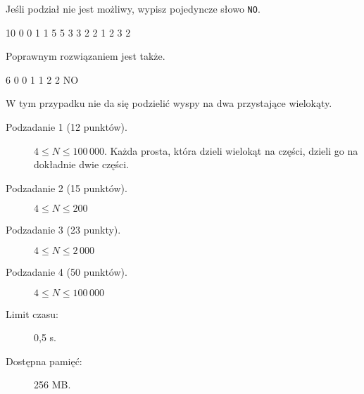 \documentclass{boi2014-pl}
\newcommand{\constant}[1]{{\tt #1}}
\begin{document}
        Jeśli podział nie jest możliwy, wypisz pojedyncze słowo \constant{NO}.

    \clearpage

    \Examples
	\example
	{
		10  0  0  1  1  5  5  3  3  2  2
	}
	{
		1 2 3 2
	}
	{
        Poprawnym rozwiązaniem jest także.
	
        \begin{center}
        \end{center}
        }

	\example
	{
		6  0  0  1  1  2  2
	}
	{
		NO
	}
        {
        W tym przypadku nie da się podzielić wyspy na dwa przystające wielokąty.
        \begin{center}
        \end{center}
        }

    \Scoring

    \begin{description}
        \item[Podzadanie 1 (12 punktów).] $4 \le N \le 100\,000$.
        Każda prosta, która dzieli wielokąt na części, dzieli go na dokładnie dwie części.
        \item[Podzadanie 2 (15 punktów).] $4 \le N \le 200$
        \item[Podzadanie 3 (23 punkty).] $4 \le N \le 2\, 000$
        \item[Podzadanie 4 (50 punktów).] $4 \le N \le 100\, 000$
    \end{description}

    \Constraints

    \begin{description}
        \item[Limit czasu:] 0,5 s.
        \item[Dostępna pamięć:] 256 MB.
    \end{description}
\end{document}
